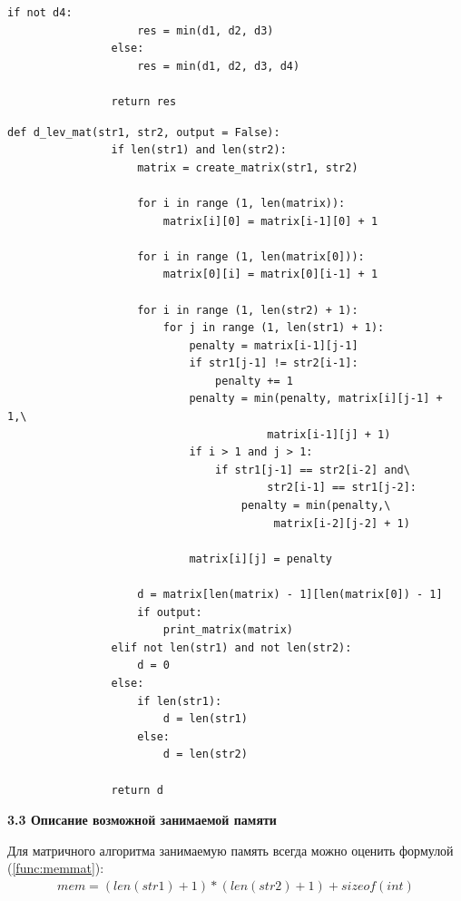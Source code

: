 \documentclass[a4paper,12pt]{report}
\begin{document}
\begin{center}
\begin{flushleft}
\begin{lstlisting}[frame = single, breaklines, caption = Листинг рекурсивного алгоритма расстояния Дамерау-Левенштейна]
	        	if not d4:
	        		res = min(d1, d2, d3)
	        	else:
	        		res = min(d1, d2, d3, d4)
	        
	        	return res
	        \end{lstlisting}
	
	        \begin{lstlisting}[frame = single, breaklines, caption = Листинг матричного алгоритма расстояния Дамерау-Левенштейна]
	        def d_lev_mat(str1, str2, output = False):
	        	if len(str1) and len(str2):
	        		matrix = create_matrix(str1, str2)
	        
	        		for i in range (1, len(matrix)):
	        			matrix[i][0] = matrix[i-1][0] + 1
	        
	        		for i in range (1, len(matrix[0])):
	        			matrix[0][i] = matrix[0][i-1] + 1
	        
	        		for i in range (1, len(str2) + 1):
	        			for j in range (1, len(str1) + 1):
	        				penalty = matrix[i-1][j-1]
	        				if str1[j-1] != str2[i-1]:
	        					penalty += 1
	        				penalty = min(penalty, matrix[i][j-1] + 1,\ 
	        							matrix[i-1][j] + 1)
	        				if i > 1 and j > 1:
	        					if str1[j-1] == str2[i-2] and\ 
	        							str2[i-1] == str1[j-2]:
	        						penalty = min(penalty,\
	        							 matrix[i-2][j-2] + 1)
	        
	        				matrix[i][j] = penalty
	        
	        		d = matrix[len(matrix) - 1][len(matrix[0]) - 1]
	        		if output:
	        			print_matrix(matrix)
	        	elif not len(str1) and not len(str2):
	        		d = 0
	        	else:
	        		if len(str1):
	        			d = len(str1)
	        		else:
	        			d = len(str2)
	        
	        	return d
	        \end{lstlisting}
	    \end{flushleft}
    
    	\textbf{3.3 Описание возможной занимаемой памяти\\}
    	\begin{flushleft}
    		Для матричного алгоритма занимаемую память всегда можно оценить формулой (\ref{func:memmat}):
    		\begin{multline}
    			\label{func:memmat}
    			mem = (len(str1)+1)*(len(str2)+1)+sizeof(int)
    		\end{multline}
    		

\end{flushleft}
\end{center}
\end{document}
